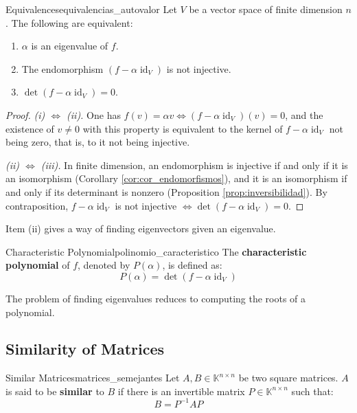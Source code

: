 \documentclass[11pt, a4paper]{article}
\begin{document}
\begin{proposicion}{Equivalences}{equivalencias_autovalor}
Let $V$ be a vector space of finite dimension $n$. The following are equivalent:
\begin{enumerate}
    \item[i)] $\alpha$ is an eigenvalue of $f$.
    \item[ii)] The endomorphism $(f - \alpha \operatorname{id}_V)$ is not injective.
    \item[iii)] $\det(f - \alpha \operatorname{id}_V) = 0$.
\end{enumerate}
\end{proposicion}

\begin{proof}
\textit{(i) $\Leftrightarrow$ (ii).} One has $f(v) = \alpha v \iff (f - \alpha \operatorname{id}_V)(v) = 0$, and the existence of $v \neq 0$ with this property is equivalent to the kernel of $f - \alpha \operatorname{id}_V$ not being zero, that is, to it not being injective.

\textit{(ii) $\Leftrightarrow$ (iii).} In finite dimension, an endomorphism is injective if and only if it is an isomorphism (Corollary \ref{cor:cor_endomorfismos}), and it is an isomorphism if and only if its determinant is nonzero (Proposition \ref{prop:inversibilidad}). By contraposition, $f - \alpha \operatorname{id}_V$ is not injective $\iff \det(f - \alpha \operatorname{id}_V) = 0$.
\end{proof}

\obs Item (ii) gives a way of finding eigenvectors given an eigenvalue.

\begin{definicion}{Characteristic Polynomial}{polinomio_caracteristico}
The \textbf{characteristic polynomial} of $f$, denoted by $P(\alpha)$, is defined as:
\[ P(\alpha) = \det(f - \alpha \operatorname{id}_V) \]
\end{definicion}

\obs The problem of finding eigenvalues reduces to computing the roots of a polynomial.

\subsection{Similarity of Matrices}

\begin{definicion}{Similar Matrices}{matrices_semejantes}
Let $A, B \in \mathbb{K}^{n \times n}$ be two square matrices. $A$ is said to be \textbf{similar} to $B$ if there is an invertible matrix $P \in \mathbb{K}^{n \times n}$ such that:
\[ B = P^{-1} A P \]
\end{definicion}
\end{document}

